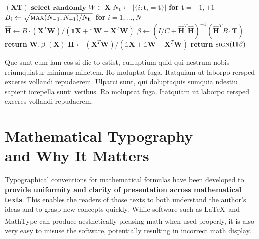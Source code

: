 \documentclass[lettersize,journal]{IEEEtran}
\begin{document}
\begin{algorithm}[H]
\caption{Weighted Tanimoto ELM.}\label{alg:alg1}
\begin{algorithmic}
\STATE 
{}$(\mathbf{X} \mathbf{T})$
\STATE \hspace{0.5cm}$ \textbf{select randomly } W \subset \mathbf{X}  $
\STATE \hspace{0.5cm}$ N_\mathbf{t} \gets | \{ i : \mathbf{t}_i = \mathbf{t} \} | $ \textbf{ for } $ \mathbf{t}= -1,+1 $
\STATE \hspace{0.5cm}$ B_i \gets \sqrt{ \textsc{max}(N_{-1},N_{+1}) / N_{\mathbf{t}_i} } $ \textbf{ for } $ i = 1,...,N $
\STATE \hspace{0.5cm}$ \hat{\mathbf{H}} \gets  B \cdot (\mathbf{X}^T\textbf{W})/( \mathbb{1}\mathbf{X} + \mathbb{1}\textbf{W} - \mathbf{X}^T\textbf{W} ) $
\STATE \hspace{0.5cm}$ \beta \gets \left ( I/C + \hat{\mathbf{H}}^T\hat{\mathbf{H}} \right )^{-1}(\hat{\mathbf{H}}^T B\cdot \mathbf{T})  $
\STATE \hspace{0.5cm}\textbf{return}  $\textbf{W},  \beta $
\STATE 
{}$(\mathbf{X} )$
\STATE \hspace{0.5cm}$ \mathbf{H} \gets  (\mathbf{X}^T\textbf{W} )/( \mathbb{1}\mathbf{X}  + \mathbb{1}\textbf{W}- \mathbf{X}^T\textbf{W}  ) $
\STATE \hspace{0.5cm}\textbf{return}  $\textsc{sign}( \mathbf{H} \beta )$
\end{algorithmic}
\label{alg1}
\end{algorithm}

Que sunt eum lam eos si dic to estist, culluptium quid qui nestrum nobis reiumquiatur minimus minctem. Ro moluptat fuga. Itatquiam ut laborpo rersped exceres vollandi repudaerem. Ulparci sunt, qui doluptaquis sumquia ndestiu sapient iorepella sunti veribus. Ro moluptat fuga. Itatquiam ut laborpo rersped exceres vollandi repudaerem. 
\section{Mathematical Typography \\ and Why It Matters}

Typographical conventions for mathematical formulas have been developed to {\bf provide uniformity and clarity of presentation across mathematical texts}. This enables the readers of those texts to both understand the author's ideas and to grasp new concepts quickly. While software such as \LaTeX \ and MathType\textsuperscript{\textregistered} can produce aesthetically pleasing math when used properly, it is also very easy to misuse the software, potentially resulting in incorrect math display.
\end{document}
